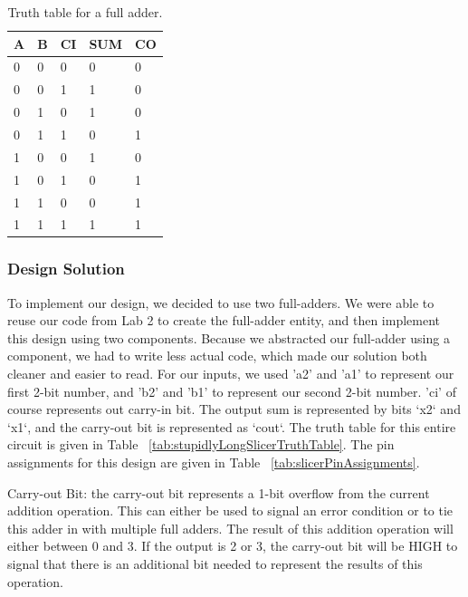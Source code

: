 \documentclass[11pt]{article}
\begin{document}
\begin{table}[h]
\begin{center}
	\begin{tabular}{| l | l | l | l | l |}
		\hline
		A & B & CI & SUM & CO \\ \hline
		0 & 0 & 0 & 0 & 0 \\ \hline
		0 & 0 & 1 & 1 & 0 \\ \hline
		0 & 1 & 0 & 1 & 0 \\ \hline
		0 & 1 & 1 & 0 & 1 \\ \hline
		1 & 0 & 0 & 1 & 0 \\ \hline
		1 & 0 & 1 & 0 & 1 \\ \hline
		1 & 1 & 0 & 0 & 1 \\ \hline
		1 & 1 & 1 & 1 & 1 \\ \hline
	\end{tabular}
	\caption{\label{tab:fullAddTruthTable}Truth table for a full adder.}
	\label{tab:fullAddTruthTable}
\end{center}
\end{table}

\subsubsection{Design Solution}
To implement our design, we decided to use two full-adders. We were able to reuse our code from Lab 2 to create the full-adder entity, and then implement this design using two components. Because we abstracted our full-adder using a component, we had to write less actual code, which made our solution both cleaner and easier to read. For our inputs, we used 'a2' and 'a1' to represent our first 2-bit number, and 'b2' and 'b1' to represent our second 2-bit number. 'ci' of course represents out carry-in bit. The output sum is represented by bits `x2` and `x1`, and the carry-out bit is represented as `cout`. The truth table for this entire circuit is given in Table ~\ref{tab:stupidlyLongSlicerTruthTable}. The pin assignments for this design are given in Table ~\ref{tab:slicerPinAssignments}.

\begin{definition}
	Carry-out Bit: the carry-out bit represents a 1-bit overflow from the current addition operation. This can either be used to signal an error condition or to tie this adder in with multiple full adders. The result of this addition operation will either between 0 and 3. If the output is 2 or 3, the carry-out bit will be HIGH to signal that there is an additional bit needed to represent the results of this operation.
\end{definition}
\end{document}
